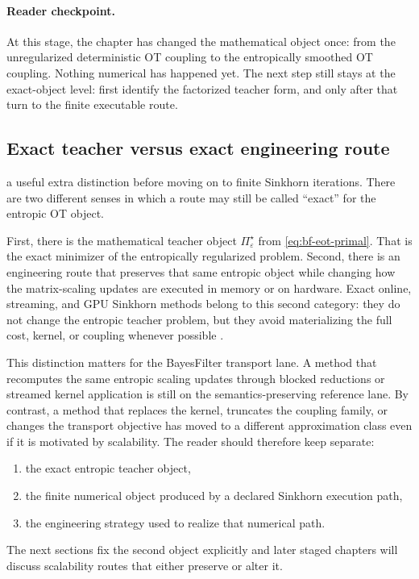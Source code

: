 \paragraph{Reader checkpoint.}
At this stage, the chapter has changed the mathematical object once: from the
unregularized deterministic OT coupling to the entropically smoothed OT coupling.
Nothing numerical has happened yet.  The next step still stays at the exact-object
level: first identify the factorized teacher form, and only after that turn to the
finite executable route.

\subsection{Exact teacher versus exact engineering route}
\label{sec:bf-eot-teacher-versus-engineering}

a useful extra distinction before moving on to
finite Sinkhorn iterations.  There are two different senses in which a route may
still be called ``exact'' for the entropic OT object.

First, there is the mathematical teacher object
\(\Pi_\varepsilon^\star\) from \eqref{eq:bf-eot-primal}.  That is the exact
minimizer of the entropically regularized problem.  Second, there is an
engineering route that preserves that same entropic object while changing how the
matrix-scaling updates are executed in memory or on hardware.  Exact online,
streaming, and GPU Sinkhorn methods belong to this second category: they do not
change the entropic teacher problem, but they avoid materializing the full cost,
kernel, or coupling whenever possible \citep{feydy2019geomloss,charlier2021keops,ye2026flashsinkhorn,xiao2026fastsinkhorn}.

This distinction matters for the BayesFilter transport lane.  A method that
recomputes the same entropic scaling updates through blocked reductions or
streamed kernel application is still on the semantics-preserving reference lane.
By contrast, a method that replaces the kernel, truncates the coupling family, or
changes the transport objective has moved to a different approximation class even
if it is motivated by scalability.  The reader should therefore keep separate:
\begin{enumerate}[label=(\roman*)]
  \item the exact entropic teacher object,
  \item the finite numerical object produced by a declared Sinkhorn execution
    path,
  \item the engineering strategy used to realize that numerical path.
\end{enumerate}
The next sections fix the second object explicitly and later staged chapters will
discuss scalability routes that either preserve or alter it.

